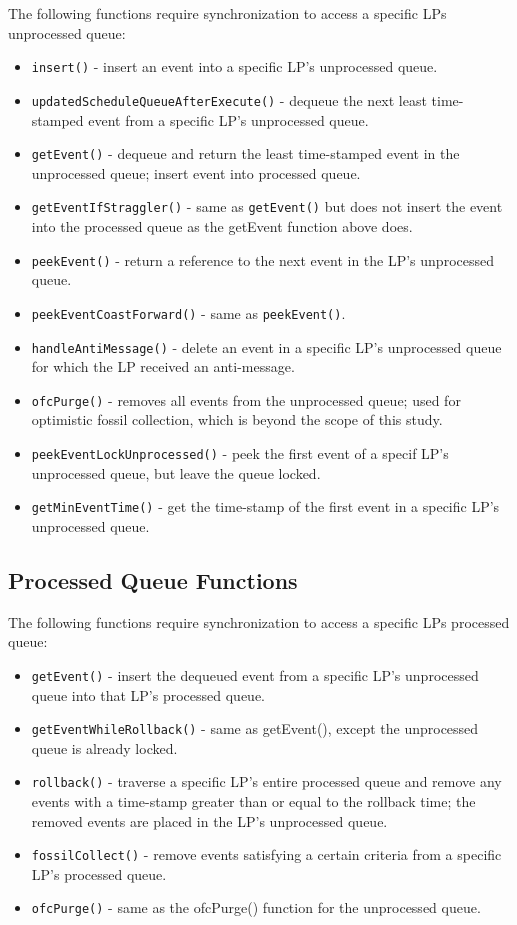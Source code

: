 \documentclass[11pt]{book}
\begin{document}
The following functions require synchronization to access a specific LPs
unprocessed queue:

\begin{itemize}
  \item\texttt{insert()} - insert an event into a specific LP's unprocessed queue.
  \item\texttt{updatedScheduleQueueAfterExecute()} - dequeue the next least time-stamped
    event from a specific LP's unprocessed queue.
  \item\texttt{getEvent()} - dequeue and return the least time-stamped event in the
    unprocessed queue; insert event into processed queue.
  \item\texttt{getEventIfStraggler()} - same as \texttt{getEvent()} but does not insert
    the event into the processed queue as the getEvent function above does.
  \item\texttt{peekEvent()} - return a reference to the next event in the LP's unprocessed
    queue.
  \item\texttt{peekEventCoastForward()} - same as \texttt{peekEvent()}.
  \item\texttt{handleAntiMessage()} - delete an event in a specific LP's unprocessed queue
    for which the LP received an anti-message.
  \item\texttt{ofcPurge()} - removes all events from the unprocessed queue; used for
    optimistic fossil collection, which is beyond the scope of this study.
  \item\texttt{peekEventLockUnprocessed()} - peek the first event of a specif LP's
    unprocessed queue, but leave the queue locked.
  \item\texttt{getMinEventTime()} - get the time-stamp of the first event in a specific
    LP's unprocessed queue.
\end{itemize}

\subsection{Processed Queue Functions}

The following functions require synchronization to access a specific LPs
processed queue:

\begin{itemize}
  \item\texttt{getEvent()} - insert the dequeued event from a specific LP's unprocessed
    queue into that LP's processed queue.
  \item\texttt{getEventWhileRollback()} - same as getEvent(), except the unprocessed queue
    is already locked.%
  \item\texttt{rollback()} - traverse a specific LP's entire processed queue and remove
    any events with a time-stamp greater than or equal to the rollback time; the removed
    events are placed in the LP's unprocessed queue.
  \item\texttt{fossilCollect()} - remove events satisfying a certain criteria from a
    specific LP's processed queue.
  \item\texttt{ofcPurge()} - same as the ofcPurge() function for the unprocessed queue.
\end{itemize}
\end{document}
